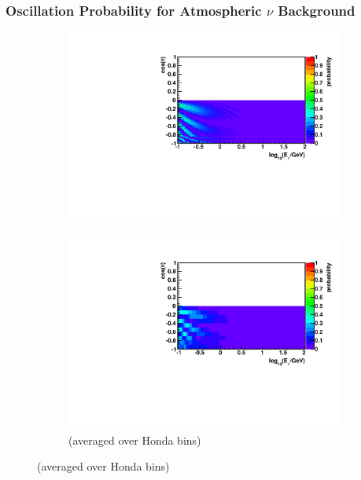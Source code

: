 \documentclass{beamer}
\begin{document}
\begin{frame}
	\frametitle{Oscillation Probability for Atmospheric $\nu$ Background}
	\begin{figure}
		\begin{subfigure}[]{0.45\linewidth}
			\centering
			\vspace{-15pt}
			\caption{ $\overline{\nu}_{\mu} \rightarrow \overline{\nu}_{e}$ }
			\vspace{-8pt}
			\includegraphics[width=\linewidth]{atm_numubar2nuebar.pdf} \\
			\vspace{-10pt}
			\caption*{(averaged over Honda bins)}
			\vspace{-8pt}
			\includegraphics[width=\linewidth]{atm_numubar2nuebar_avg.pdf}
		\end{subfigure}

\end{figure}
\end{frame}
\end{document}
